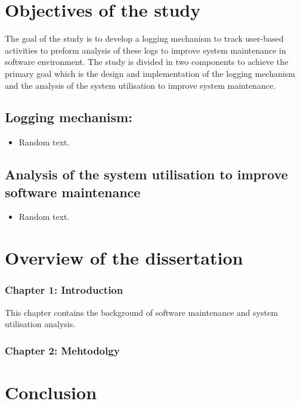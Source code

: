 \newpage

\section{Objectives of the study}
The goal of the study is to develop a logging mechanism to track user-based
activities to preform analysis of these logs to improve system maintenance in
software environment. The study is divided in two components to achieve the
primary goal which is the design and implementation of the logging mechanism
and the analysis of the system utilisation to improve system maintenance.

\subsection{Logging mechanism:}
\begin{itemize}
	\item Random text.
\end{itemize}

\subsection{Analysis of the system utilisation to improve software maintenance}
\begin{itemize}
	\item Random text.
\end{itemize}

\section{Overview of the dissertation}
\subsubsection{Chapter 1: Introduction}
This chapter contains the background of software maintenance and system
utilisation analysis.
\subsubsection{Chapter 2: Mehtodolgy}

\section{Conclusion}


